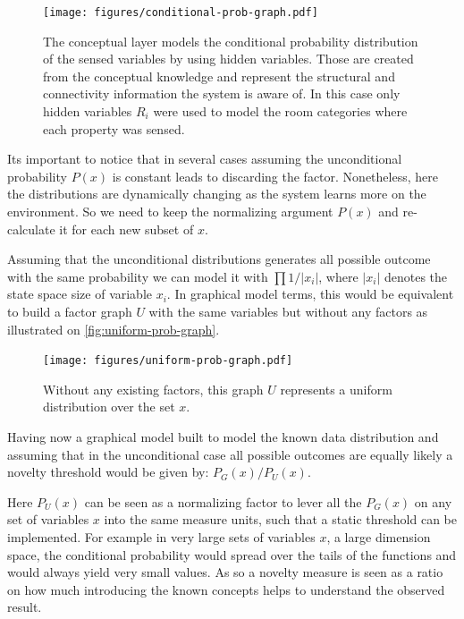 \documentclass[runningheads,a4paper]{llncs}
\begin{document}
\begin{figure}[h]
\centering
\texttt{[image: figures/conditional-prob-graph.pdf]}
\caption{\label{fig:conditional-prob-graph}The conceptual layer models the conditional
         probability distribution of the sensed variables by using hidden variables.
         Those are created from the conceptual knowledge and represent the structural
         and connectivity information the system is aware of.
         In this case only hidden variables $R_i$ were used to model the room categories
         where each property was sensed.}
\end{figure}


Its important to notice that in several cases assuming the unconditional probability $P(x)$ is constant leads to discarding the factor.
Nonetheless, here the distributions are dynamically changing as the system learns more on the environment.
So we need to keep the normalizing argument $P(x)$ and re-calculate it for each new subset of $x$.

Assuming that the unconditional distributions generates all possible outcome with the same probability
we can model it with $\prod{1/|x_i|}$, where $|x_i|$ denotes the state space size of variable $x_i$.
In graphical model terms, this would be equivalent to build a factor graph $U$ with the same variables but
without any factors as illustrated on \autoref{fig:uniform-prob-graph}.

\begin{figure}
\centering
\texttt{[image: figures/uniform-prob-graph.pdf]}
\caption{\label{fig:uniform-prob-graph}Without any existing factors, this graph $U$ represents a uniform
         distribution over the set $x$.}
\end{figure}

Having now a graphical model built to model the known data distribution and assuming that in the unconditional case all
possible outcomes are equally likely a novelty threshold would be given by: $P_G(x)/P_{U}(x)$.

Here $P_{U}(x)$ can be seen as a normalizing factor to lever all the $P_G(x)$ on any set of variables $x$ into the same
measure units, such that a static threshold can be implemented.
For example in very large sets of variables $x$, a large dimension space, the conditional probability would spread over
the tails of the functions and would always yield very small values.
As so a novelty measure is seen as a ratio on how much introducing the known concepts helps to understand the observed result.
\end{document}
